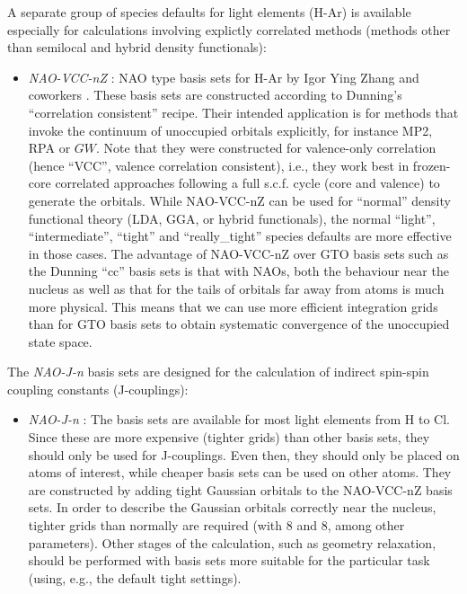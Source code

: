 A separate group of species defaults for light elements (H-Ar) is
available especially for calculations involving explictly correlated
methods (methods other than semilocal and hybrid density functionals): 
\begin{itemize}
  \item \emph{NAO-VCC-nZ} : NAO type basis sets for H-Ar by Igor Ying
    Zhang and coworkers \cite{Zhang2013}. These basis sets
    are constructed according to Dunning's ``correlation consistent''
    recipe. Their intended application is for methods that invoke
    the continuum of unoccupied orbitals explicitly, for instance MP2,
    RPA or $GW$. Note that they were constructed for valence-only
    correlation (hence ``VCC'', valence correlation consistent), i.e.,
    they work best in frozen-core correlated approaches following a
    full s.c.f. cycle (core and valence) to generate the
    orbitals. While NAO-VCC-nZ can be used for ``normal'' density
    functional theory (LDA, GGA, or hybrid functionals), the normal
    ``light'', ``intermediate'', ``tight'' and ``really\_tight'' species defaults are
    more effective in those cases. The advantage of NAO-VCC-nZ over
    GTO basis sets such as the Dunning ``cc'' basis sets is that with
    NAOs, both the behaviour near the nucleus as well as that for the
    tails of orbitals far away from atoms is much more physical. This
    means that we can use more efficient integration grids than for
    GTO basis sets to obtain systematic convergence of the unoccupied
    state space. 
\end{itemize}

The \textit{NAO-J-n} basis sets are designed for the calculation of indirect spin-spin coupling constants (J-couplings):
\begin{itemize}
\item \textit{NAO-J-n} : The basis sets are available for most light elements from H to Cl. Since these are more expensive (tighter grids) than other basis sets, they should only be used for J-couplings. Even then, they should only be placed on atoms of interest, while cheaper basis sets can be used on other atoms. They are constructed by adding tight Gaussian orbitals to the NAO-VCC-nZ basis sets. In order to describe the Gaussian orbitals correctly near the nucleus, tighter grids than normally are required (with  8 and  8, among other parameters). Other stages of the calculation, such as geometry relaxation, should be performed with basis sets more suitable for the particular task (using, e.g., the default tight settings).
\end{itemize}

